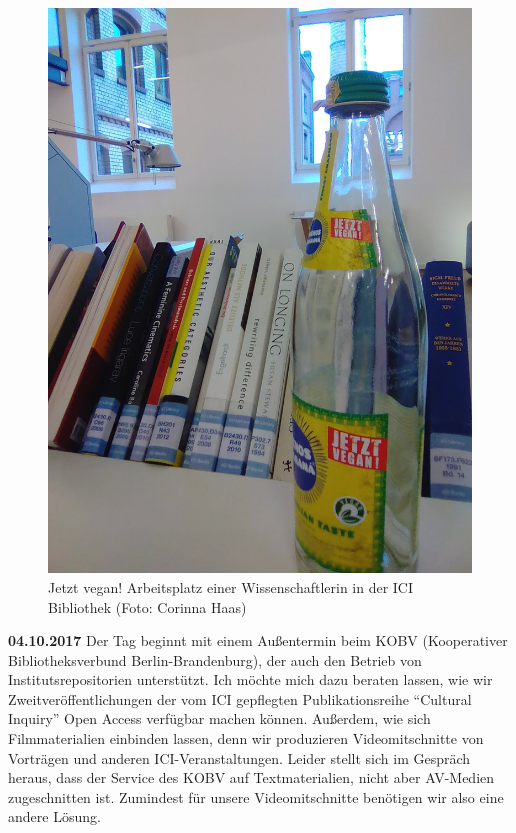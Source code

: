 \documentclass[a4paper,
fontsize=11pt,
oneside,
numbers=noperiodatend,
parskip=half-,
bibliography=totoc,
final
]{scrartcl}
\begin{document}
\begin{figure}
\centering
\includegraphics{img/Haas_1.jpg}
\caption{Jetzt vegan! Arbeitsplatz einer Wissenschaftlerin in der ICI
Bibliothek (Foto: Corinna Haas)}
\end{figure}

\textbf{04.10.2017} Der Tag beginnt mit einem Außentermin beim KOBV
(Kooperativer Bibliotheksverbund Berlin-Brandenburg), der auch den
Betrieb von Institutsrepositorien unterstützt. Ich möchte mich dazu
beraten lassen, wie wir Zweitveröffentlichungen der vom ICI gepflegten
Publikationsreihe \enquote{Cultural Inquiry} Open Access verfügbar
machen können. Außerdem, wie sich Filmmaterialien einbinden lassen, denn
wir produzieren Videomitschnitte von Vorträgen und anderen
ICI-Veranstaltungen. Leider stellt sich im Gespräch heraus, dass der
Service des KOBV auf Textmaterialien, nicht aber AV-Medien zugeschnitten
ist. Zumindest für unsere Videomitschnitte benötigen wir also eine
andere Lösung.
\end{document}
